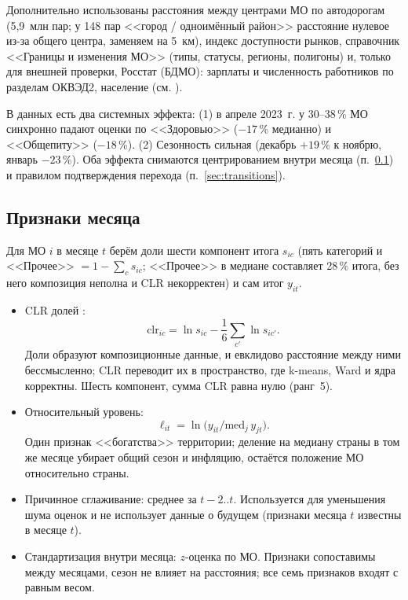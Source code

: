 \documentclass[11pt,a4paper]{article}
\newcommand{\code}[1]{\path{#1}}
\begin{document}
Дополнительно использованы расстояния между центрами МО по автодорогам (5,9~млн пар; у 148 пар <<город / одноимённый район>> расстояние нулевое из-за общего центра, заменяем на 5~км), индекс доступности рынков, справочник <<Границы и изменения МО>> (типы, статусы, регионы, полигоны) и, только для внешней проверки, Росстат (БДМО): зарплаты и численность работников по разделам ОКВЭД2, население (см. \code{docs/external_data.md}).

В данных есть два системных эффекта: (1) в апреле 2023~г. у 30--38\,\% МО синхронно падают оценки по <<Здоровью>> ($-17$\,\% медианно) и <<Общепиту>> ($-18$\,\%). (2) Сезонность сильная (декабрь $+19$\,\% к ноябрю, январь $-23$\,\%). Оба эффекта снимаются центрированием внутри месяца (п.~\ref{sec:features}) и правилом подтверждения перехода (п.~\ref{sec:transitions}).

\subsection{Признаки месяца}\label{sec:features}
Для МО $i$ в месяце $t$ берём доли шести компонент итога $s_{ic}$ (пять категорий и <<Прочее>> $=1-\sum_c s_{ic}$; <<Прочее>> в медиане составляет 28\,\% итога, без него композиция неполна и CLR некорректен) и сам итог $y_{it}$.

\begin{itemize}
\item CLR долей \cite{aitchison}:
\begin{equation}\label{eq:clr}
\mathrm{clr}_{ic} = \ln s_{ic} - \frac16\sum_{c'}\ln s_{ic'}.
\end{equation}
Доли образуют композиционные данные, и евклидово расстояние между ними бессмысленно; CLR переводит их в пространство, где k-means, Ward и ядра корректны. Шесть компонент, сумма CLR равна нулю (ранг~5).
\item Относительный уровень:
\begin{equation}\label{eq:level}
\ell_{it} = \ln\bigl(y_{it} / \mathrm{med}_j\, y_{jt}\bigr).
\end{equation}
Один признак <<богатства>> территории; деление на медиану страны в том же месяце убирает общий сезон и инфляцию, остаётся положение МО относительно страны.
\item Причинное сглаживание: среднее за $t-2..t$. Используется для уменьшения шума оценок и не использует данные о будущем (признаки месяца $t$ известны в месяце $t$).
\item Стандартизация внутри месяца: $z$-оценка по МО. Признаки сопоставимы между месяцами, сезон не влияет на расстояния; все семь признаков входят с равным весом.
\end{itemize}
\end{document}
